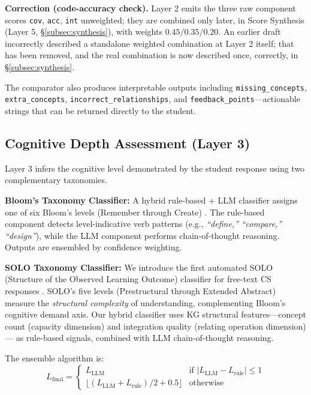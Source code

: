 \documentclass[conference]{IEEEtran}
\begin{document}
\textbf{Correction (code-accuracy check).} Layer 2 emits the three raw
component scores \texttt{cov}, \texttt{acc}, \texttt{int} unweighted;
they are combined only later, in Score Synthesis (Layer 5,
\S\ref{subsec:synthesis}), with weights $0.45/0.35/0.20$. An earlier
draft incorrectly described a standalone weighted combination at Layer
2 itself; that has been removed, and the real combination is now
described once, correctly, in \S\ref{subsec:synthesis}.

The comparator also produces interpretable outputs including \texttt{missing\_concepts},
\texttt{extra\_concepts}, \texttt{incorrect\_relationships}, and
\texttt{feedback\_points}—actionable strings that can be returned directly to
the student.

\subsection{Cognitive Depth Assessment (Layer 3)}

Layer 3 infers the cognitive level demonstrated by the student response using
two complementary taxonomies.

\textbf{Bloom's Taxonomy Classifier:} A hybrid rule-based + LLM classifier
assigns one of six Bloom's levels (Remember through Create)
\cite{bloom1956,anderson2001}. The rule-based component detects level-indicative
verb patterns (e.g., \emph{``define,''} \emph{``compare,''} \emph{``design''}),
while the LLM component performs chain-of-thought reasoning. Outputs are ensembled
by confidence weighting.

\textbf{SOLO Taxonomy Classifier:} We introduce the first automated SOLO
(Structure of the Observed Learning Outcome) classifier for free-text CS responses
\cite{biggs1982}. SOLO's five levels (Prestructural through Extended Abstract)
measure the \emph{structural complexity} of understanding, complementing Bloom's
cognitive demand axis. Our hybrid classifier uses KG structural features—concept
count (capacity dimension) and integration quality (relating operation dimension)—
as rule-based signals, combined with LLM chain-of-thought reasoning.

The ensemble algorithm is:
\begin{equation}
  L_{\text{final}} =
  \begin{cases}
    L_{\text{LLM}} & \text{if } |L_{\text{LLM}} - L_{\text{rule}}| \leq 1 \\
    \lfloor(L_{\text{LLM}} + L_{\text{rule}}) / 2 + 0.5\rfloor & \text{otherwise}
  \end{cases}
  \label{eq:ensemble}
\end{equation}
\end{document}
